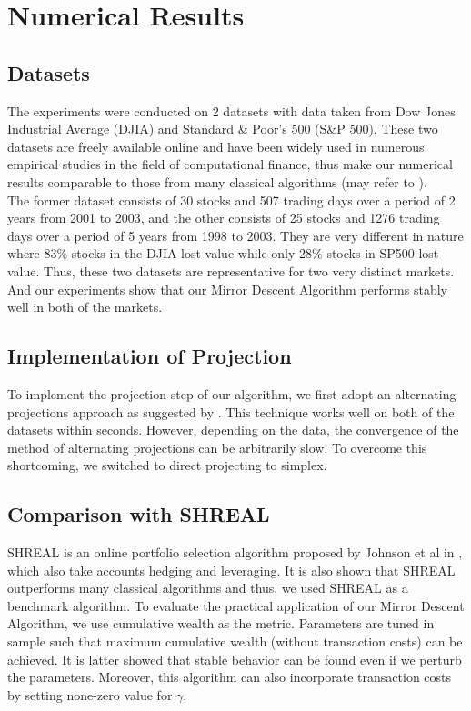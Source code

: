 \section{Numerical Results}

\subsection{Datasets}
The experiments were conducted on 2 datasets with data taken from Dow Jones Industrial Average (DJIA) and Standard \& Poor's 500 (S\&P 500). These two datasets are freely available online and have been widely used in numerous empirical studies in the field of computational finance, thus make our numerical results comparable to those from many classical algorithms (may refer to \cite{johnson2015structured,das2014online}).\\

\noindent The former dataset consists of 30 stocks and 507 trading days over a period of 2 years from 2001 to 2003, and the other consists
of 25 stocks and 1276 trading days over a period of 5 years from 1998 to 2003. They are very different in nature where 83\% stocks in the DJIA lost value while only 28\% stocks in SP500 lost value. Thus, these two datasets are representative for two very distinct markets. And our experiments show that our Mirror Descent Algorithm performs stably well in both of the markets.


\subsection{Implementation of Projection}
To implement the projection step of our algorithm, we first adopt an alternating projections approach as suggested by \cite{johnson2015structured}. This technique works well on both of the datasets within seconds. However, depending on the data, the convergence of the method of alternating projections can be arbitrarily slow. To overcome this shortcoming, we switched to direct projecting to simplex. 

\subsection{Comparison with SHREAL}
SHREAL is an online portfolio selection algorithm proposed by Johnson et al in \cite{johnson2015structured}, which also take accounts hedging and leveraging. It is also shown that SHREAL outperforms many classical algorithms and thus, we used SHREAL as a benchmark algorithm. To evaluate the practical application of our Mirror Descent Algorithm, we use cumulative wealth as the metric. Parameters are tuned in sample such that maximum cumulative wealth (without transaction costs) can be achieved. It is latter showed that stable behavior can be found even if we perturb the parameters. Moreover, this algorithm can also incorporate transaction costs by setting none-zero value for $\gamma$.

